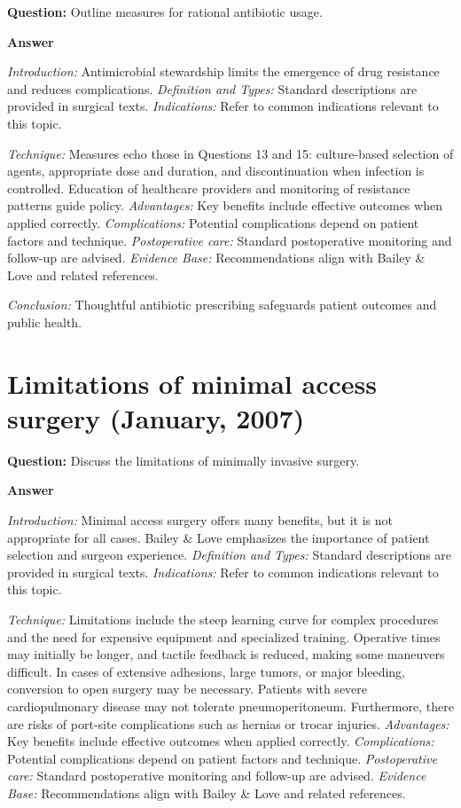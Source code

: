 \documentclass{article}
\begin{document}
\textbf{Question:} Outline measures for rational antibiotic usage.

\textbf{Answer}

\emph{Introduction:} Antimicrobial stewardship limits the emergence of drug resistance and reduces complications.
\emph{Definition and Types:} Standard descriptions are provided in surgical texts.
\emph{Indications:} Refer to common indications relevant to this topic.

\emph{Technique:} Measures echo those in Questions 13 and 15: culture-based selection of agents, appropriate dose and duration, and discontinuation when infection is controlled. Education of healthcare providers and monitoring of resistance patterns guide policy.
\emph{Advantages:} Key benefits include effective outcomes when applied correctly.
\emph{Complications:} Potential complications depend on patient factors and technique.
\emph{Postoperative care:} Standard postoperative monitoring and follow-up are advised.
\emph{Evidence Base:} Recommendations align with Bailey \& Love and related references.

\emph{Conclusion:} Thoughtful antibiotic prescribing safeguards patient outcomes and public health.


\section{Limitations of minimal access surgery (January, 2007)}

\textbf{Question:} Discuss the limitations of minimally invasive surgery.

\textbf{Answer}

\emph{Introduction:} Minimal access surgery offers many benefits, but it is not appropriate for all cases. Bailey \& Love emphasizes the importance of patient selection and surgeon experience.
\emph{Definition and Types:} Standard descriptions are provided in surgical texts.
\emph{Indications:} Refer to common indications relevant to this topic.

\emph{Technique:} Limitations include the steep learning curve for complex procedures and the need for expensive equipment and specialized training. Operative times may initially be longer, and tactile feedback is reduced, making some maneuvers difficult. In cases of extensive adhesions, large tumors, or major bleeding, conversion to open surgery may be necessary. Patients with severe cardiopulmonary disease may not tolerate pneumoperitoneum. Furthermore, there are risks of port-site complications such as hernias or trocar injuries.
\emph{Advantages:} Key benefits include effective outcomes when applied correctly.
\emph{Complications:} Potential complications depend on patient factors and technique.
\emph{Postoperative care:} Standard postoperative monitoring and follow-up are advised.
\emph{Evidence Base:} Recommendations align with Bailey \& Love and related references.
\end{document}
